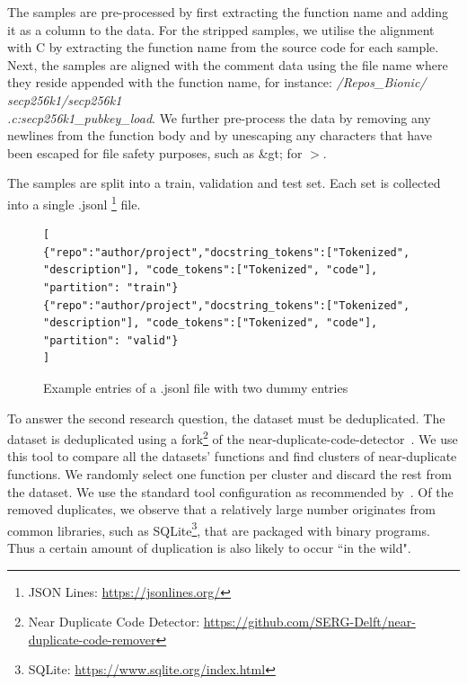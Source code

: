 The samples are pre-processed by first extracting the function name and adding it as a column to the data. For the stripped samples, we utilise the alignment with C by extracting the function name from the source code for each sample. Next, the samples are aligned with the comment data using the file name where they reside appended with the function name, for instance: \textit{/Repos\_Bionic/ secp256k1/secp256k1\\.c:secp256k1\_pubkey\_load}. We further pre-process the data by removing any newlines from the function body and by unescaping any characters that have been escaped for file safety purposes, such as \&gt; for $>$.

The samples are split into a train, validation and test set. Each set is collected into a single .jsonl \footnote{JSON Lines: \url{https://jsonlines.org/}} file.

\begin{figure}[tbh]
  \centering
\begin{verbatim}
[
{"repo":"author/project","docstring_tokens":["Tokenized", "description"], "code_tokens":["Tokenized", "code"], "partition": "train"}
{"repo":"author/project","docstring_tokens":["Tokenized", "description"], "code_tokens":["Tokenized", "code"], "partition": "valid"}
]
\end{verbatim}
  \caption{Example entries of a .jsonl file with two dummy entries}
  \label{fig:jsonl}
\end{figure}


To answer the second research question, the dataset must be deduplicated. The dataset is deduplicated using a fork\footnote{Near Duplicate Code Detector: \url{https://github.com/SERG-Delft/near-duplicate-code-remover}} of the near-duplicate-code-detector~\cite{allamanis_adverse}. We use this tool to compare all the datasets' functions and find clusters of near-duplicate functions. We randomly select one function per cluster and discard the rest from the dataset. We use the standard tool configuration as recommended by~\citeauthor{allamanis_adverse}. Of the removed duplicates, we observe that a relatively large number originates from common libraries, such as SQLite\footnote{SQLite: \url{https://www.sqlite.org/index.html}}, that are packaged with binary programs. Thus a certain amount of duplication is also likely to occur ``in the wild".

